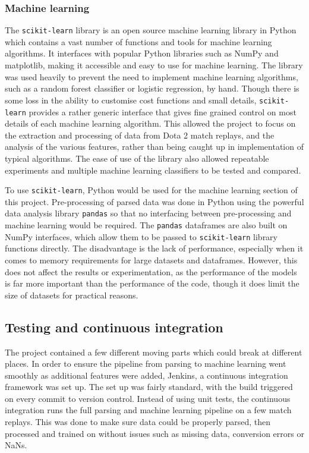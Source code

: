 \documentclass[Report.tex]{subfiles}
\begin{document}
\subsubsection{Machine learning}
The \texttt{scikit-learn} library \cite{sklearn} is an open source machine learning library in Python which contains a vast number of functions and tools for machine learning algorithms. It interfaces with popular Python libraries such as NumPy and matplotlib, making it accessible and easy to use for machine learning. The library was used heavily to prevent the need to implement machine learning algorithms, such as a random forest classifier or logistic regression, by hand. Though there is some loss in the ability to customise cost functions and small details, \texttt{scikit-learn} provides a rather generic interface that gives fine grained control on most details of each machine learning algorithm. This allowed the project to focus on the extraction and processing of data from Dota 2 match replays, and the analysis of the various features, rather than being caught up in implementation of typical algorithms. The ease of use of the library also allowed repeatable experiments and multiple machine learning classifiers to be tested and compared.

To use \texttt{scikit-learn}, Python would be used for the machine learning section of this project. Pre-processing of parsed data was done in Python using the powerful data analysis library \texttt{pandas} \cite{pandas} so that no interfacing between pre-processing and machine learning would be required. The \texttt{pandas} dataframes are also built on NumPy interfaces, which allow them to be passed to \texttt{scikit-learn} library functions directly. The disadvantage is the lack of performance, especially when it comes to memory requirements for large datasets and dataframes. However, this does not affect the results or experimentation, as the performance of the models is far more important than the performance of the code, though it does limit the size of datasets for practical reasons.

\subsection{Testing and continuous integration}
The project contained a few different moving parts which could break at different places. In order to ensure the pipeline from parsing to machine learning went smoothly as additional features were added, Jenkins, a continuous integration framework was set up. The set up was fairly standard, with the build triggered on every commit to version control. Instead of using unit tests, the continuous integration runs the full parsing and machine learning pipeline on a few match replays. This was done to make sure data could be properly parsed, then processed and trained on without issues such as missing data, conversion errors or NaNs. 
\end{document}
